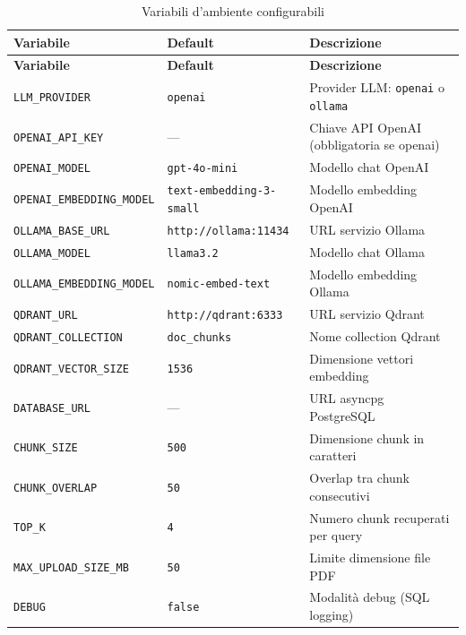 \begin{longtable}{l p{3.2cm} p{7cm}}
  \toprule
  \textbf{Variabile} & \textbf{Default} & \textbf{Descrizione} \\
  \midrule
  \endfirsthead
  \midrule
  \textbf{Variabile} & \textbf{Default} & \textbf{Descrizione} \\
  \midrule
  \endhead
  \bottomrule
  \endfoot
  \bottomrule
  \caption{Variabili d'ambiente configurabili}
  \endlastfoot
  \texttt{LLM\_PROVIDER}           & \texttt{openai}             & Provider LLM: \texttt{openai} o \texttt{ollama} \\
  \texttt{OPENAI\_API\_KEY}         & —                           & Chiave API OpenAI (obbligatoria se openai) \\
  \texttt{OPENAI\_MODEL}            & \texttt{gpt-4o-mini}        & Modello chat OpenAI \\
  \texttt{OPENAI\_EMBEDDING\_MODEL} & \texttt{text-embedding-3-small} & Modello embedding OpenAI \\
  \texttt{OLLAMA\_BASE\_URL}        & \texttt{http://ollama:11434} & URL servizio Ollama \\
  \texttt{OLLAMA\_MODEL}            & \texttt{llama3.2}           & Modello chat Ollama \\
  \texttt{OLLAMA\_EMBEDDING\_MODEL} & \texttt{nomic-embed-text}   & Modello embedding Ollama \\
  \texttt{QDRANT\_URL}              & \texttt{http://qdrant:6333} & URL servizio Qdrant \\
  \texttt{QDRANT\_COLLECTION}       & \texttt{doc\_chunks}        & Nome collection Qdrant \\
  \texttt{QDRANT\_VECTOR\_SIZE}     & \texttt{1536}               & Dimensione vettori embedding \\
  \texttt{DATABASE\_URL}            & —                           & URL asyncpg PostgreSQL \\
  \texttt{CHUNK\_SIZE}              & \texttt{500}                & Dimensione chunk in caratteri \\
  \texttt{CHUNK\_OVERLAP}           & \texttt{50}                 & Overlap tra chunk consecutivi \\
  \texttt{TOP\_K}                   & \texttt{4}                  & Numero chunk recuperati per query \\
  \texttt{MAX\_UPLOAD\_SIZE\_MB}    & \texttt{50}                 & Limite dimensione file PDF \\
  \texttt{DEBUG}                    & \texttt{false}              & Modalità debug (SQL logging) \\
\end{longtable}

